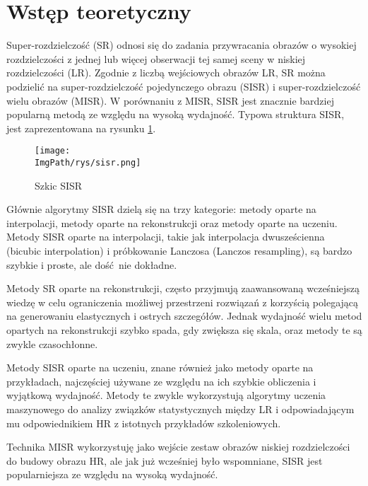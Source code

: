 \documentclass[a4paper,12pt,twoside,openany]{report}
\newcommand{\ImgPath}{.}
\begin{document}

\section{Wstęp teoretyczny}
	Super-rozdzielczość (SR) odnosi się do zadania przywracania obrazów o wysokiej rozdzielczości z jednej lub więcej obserwacji tej samej sceny w niskiej rozdzielczości (LR). Zgodnie z liczbą wejściowych obrazów LR, SR można podzielić na super-rozdzielczość pojedynczego obrazu (SISR) i super-rozdzielczość wielu obrazów (MISR). W porównaniu z MISR, SISR jest znacznie bardziej popularną metodą ze względu na wysoką wydajność. Typowa struktura SISR, jest zaprezentowana na rysunku \ref{szkicSisr}.
	\begin{figure}[!htbp]
		\begin{center}
			\centering
			\texttt{[image: \\ImgPath/rys/sisr.png]}
		\end{center}
		\caption{Szkic SISR}
		\label{szkicSisr}
	\end{figure}
  	\newpage
  	Głównie algorytmy SISR dzielą się na trzy kategorie: metody oparte na interpolacji, metody oparte na rekonstrukcji oraz metody oparte na uczeniu. Metody SISR oparte na interpolacji, takie jak interpolacja dwusześcienna (bicubic  interpolation) i próbkowanie Lanczosa (Lanczos resampling), są bardzo szybkie i proste, ale dość nie dokładne.
  
  	Metody SR oparte na rekonstrukcji,  często przyjmują zaawansowaną wcześniejszą wiedzę w celu ograniczenia możliwej przestrzeni rozwiązań z korzyścią polegającą na generowaniu elastycznych i ostrych szczegółów. Jednak wydajność wielu metod opartych na rekonstrukcji szybko spada, gdy zwiększa się skala, oraz metody te są zwykle czasochłonne.
  
  	Metody SISR oparte na uczeniu, znane również jako metody oparte na przykładach, najczęściej używane ze względu na ich szybkie obliczenia i wyjątkową wydajność. Metody te zwykle wykorzystują algorytmy uczenia maszynowego do analizy związków statystycznych między LR i odpowiadającym mu odpowiednikiem HR z istotnych przykładów szkoleniowych.
  
  	Technika MISR wykorzystuję jako wejście zestaw obrazów niskiej rozdzielczości do budowy obrazu HR, ale jak już wcześniej było wspomniane, SISR jest popularniejsza ze względu na wysoką wydajność.

  
\end{document}
